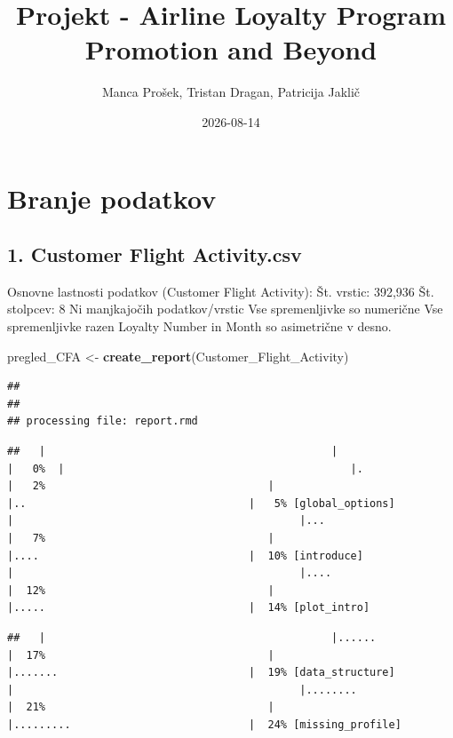 \documentclass[
]{article}
\title{Projekt - Airline Loyalty Program Promotion and Beyond}
\author{Manca Prošek, Tristan Dragan, Patricija Jaklič}
\date{2026-08-14}
\newenvironment{Shaded}{\begin{snugshade}}{\end{snugshade}}
\newcommand{\FunctionTok}[1]{\textcolor[rgb]{0.13,0.29,0.53}{\textbf{#1}}}
\newcommand{\NormalTok}[1]{#1}
\newcommand{\OtherTok}[1]{\textcolor[rgb]{0.56,0.35,0.01}{#1}}
\begin{document}
\maketitle

\section{Branje podatkov}\label{branje-podatkov}

\subsection{1. Customer Flight
Activity.csv}\label{customer-flight-activity.csv}

Osnovne lastnosti podatkov (Customer Flight Activity): Št. vrstic:
392,936 Št. stolpcev: 8 Ni manjkajočih podatkov/vrstic Vse spremenljivke
so numerične Vse spremenljivke razen Loyalty Number in Month so
asimetrične v desno.

\begin{Shaded}
\begin{Highlighting}[]
\NormalTok{pregled\_CFA }\OtherTok{\textless{}{-}} \FunctionTok{create\_report}\NormalTok{(Customer\_Flight\_Activity)}
\end{Highlighting}
\end{Shaded}

\begin{verbatim}
## 
## 
## processing file: report.rmd
\end{verbatim}

\begin{verbatim}
##   |                                             |                                     |   0%  |                                             |.                                    |   2%                                   |                                             |..                                   |   5% [global_options]                  |                                             |...                                  |   7%                                   |                                             |....                                 |  10% [introduce]                       |                                             |....                                 |  12%                                   |                                             |.....                                |  14% [plot_intro]
\end{verbatim}

\begin{verbatim}
##   |                                             |......                               |  17%                                   |                                             |.......                              |  19% [data_structure]                  |                                             |........                             |  21%                                   |                                             |.........                            |  24% [missing_profile]
\end{verbatim}
\end{document}
